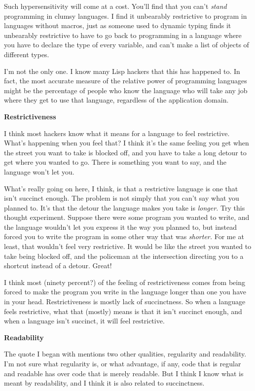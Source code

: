 Such hypersensitivity will come at a cost. You'll find that you can't
\emph{stand} programming in clumsy languages. I find it unbearably
restrictive to program in languages without macros, just as someone used
to dynamic typing finds it unbearably restrictive to have to go back to
programming in a language where you have to declare the type of every
variable, and can't make a list of objects of different types.

I'm not the only one. I know many Lisp hackers that this has happened
to. In fact, the most accurate measure of the relative power of
programming languages might be the percentage of people who know the
language who will take any job where they get to use that language,
regardless of the application domain.

\textbf{Restrictiveness}

I think most hackers know what it means for a language to feel
restrictive. What's happening when you feel that? I think it's the same
feeling you get when the street you want to take is blocked off, and you
have to take a long detour to get where you wanted to go. There is
something you want to say, and the language won't let you.

What's really going on here, I think, is that a restrictive language is
one that isn't succinct enough. The problem is not simply that you can't
say what you planned to. It's that the detour the language makes you
take is \emph{longer.} Try this thought experiment. Suppose there were
some program you wanted to write, and the language wouldn't let you
express it the way you planned to, but instead forced you to write the
program in some other way that was \emph{shorter.} For me at least, that
wouldn't feel very restrictive. It would be like the street you wanted
to take being blocked off, and the policeman at the intersection
directing you to a shortcut instead of a detour. Great!

I think most (ninety percent?) of the feeling of restrictiveness comes
from being forced to make the program you write in the language longer
than one you have in your head. Restrictiveness is mostly lack of
succinctness. So when a language feels restrictive, what that (mostly)
means is that it isn't succinct enough, and when a language isn't
succinct, it will feel restrictive.

\textbf{Readability}

The quote I began with mentions two other qualities, regularity and
readability. I'm not sure what regularity is, or what advantage, if any,
code that is regular and readable has over code that is merely readable.
But I think I know what is meant by readability, and I think it is also
related to succinctness.

